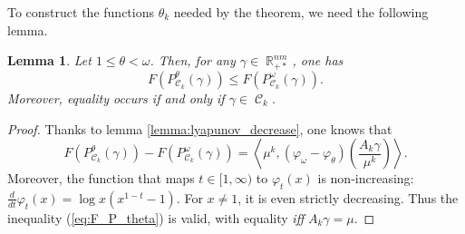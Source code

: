 \documentclass{article} %
\newcommand{\scal}[2]{\left\langle #1 , #2 \right\rangle}
\DeclareMathOperator{\IR}{\mathbb{R}}
\DeclareMathOperator{\Ccal}{\mathcal{C}}
\theoremstyle{plain}
\newtheorem{lemma}{Lemma}
\theoremstyle{definition}
\theoremstyle{remark}
\begin{document}
To construct the functions $\theta_k$ needed by the theorem, we need the following lemma.

\begin{lemma}\label{lemma:F_P_theta}
	Let $1\le \theta < \omega$. Then, for any $\gamma \in \IR_{+*}^{nm}$, one has
	\begin{equation}\label{eq:F_P_theta}
	F(P^\theta_{\Ccal_k}(\gamma)) \le F(P^\omega_{\Ccal_k}(\gamma)).
	\end{equation}
	Moreover, equality occurs if and only if $\gamma \in \Ccal_k$.
\end{lemma}
\begin{proof}
	Thanks to lemma \ref{lemma:lyapunov_decrease}, one knows that
	\[
	F(P^\theta_{\Ccal_k}(\gamma)) - F(P^\omega_{\Ccal_k}(\gamma))
	= \scal{\mu^k}{(\varphi_\omega - \varphi_\theta) \left( \frac{A_k \gamma}{\mu^k} \right) } .
	\]
	Moreover, the function that maps $t \in [1,\infty)$ to $\varphi_t(x)$ is non-increasing:
	$\frac{d}{dt} \varphi_t(x) = \log x (x^{1-t} - 1).$
	For $x\neq 1$, it is even strictly decreasing.
	Thus the inequality (\ref{eq:F_P_theta}) is valid, with equality \emph{iff} $A_k \gamma = \mu$.
\end{proof}
\end{document}

